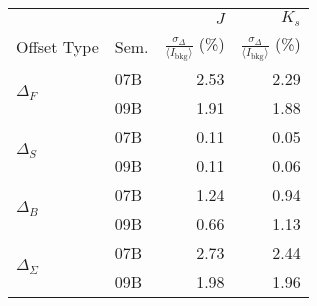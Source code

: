 \begin{tabular}{ll|rr}
&  & $J$ & $K_s$ \\ %
Offset Type & Sem. & $\frac{\sigma_\Delta}{\langle I_\mathrm{bkg}\rangle }$ (\%) & $\frac{\sigma_\Delta}{\langle I_\mathrm{bkg}\rangle }$ (\%) \\
\hline
\multirow{2}{*}{$\Delta_F$} & 07B & 2.53 & 2.29 \\
& 09B  & 1.91 & 1.88 \\
\hline
\multirow{2}{*}{$\Delta_S$} & 07B & 0.11 & 0.05 \\
& 09B & 0.11 & 0.06 \\
\hline
\multirow{2}{*}{$\Delta_B$} & 07B & 1.24 & 0.94 \\
& 09B & 0.66 & 1.13 \\
\hline
\multirow{2}{*}{$\Delta_\Sigma$} & 07B & 2.73 & 2.44 \\
& 09B & 1.98 & 1.96 \\
\end{tabular}
